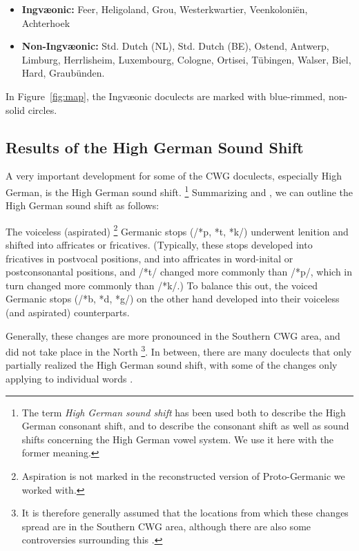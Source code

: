 \documentclass[a4paper]{article}
\begin{document}
\begin{itemize}
\item 
\textbf{Ingv\ae{}onic:}
Feer, Heligoland, Grou,
Westerkwartier, Veenkoloni\"{e}n, Achterhoek

\item
\textbf{Non-Ingv\ae{}onic:}
Std. Dutch (NL), Std. Dutch (BE), Ostend, Antwerp, Limburg,
Herrlisheim, Luxembourg, Cologne,
Ortisei, T\"{u}bingen, Walser, Biel, Hard, Graub\"{u}nden.
\end{itemize}

In Figure~\ref{fig:map}, the Ingv\ae{}onic doculects
are marked with blue-rimmed, non-solid circles.

\subsection{Results of the High German Sound Shift}

A very important development for some of the CWG doculects,
especially High German, is the High German sound shift.
\footnote{
The term \textit{High German sound shift} has been used both
to describe the High German consonant shift,
and to describe the consonant shift as well as
sound shifts concerning the High German vowel system.
We use it here with the former meaning.
}
Summarizing \citet[pp. 47--48]{harbert2007germanic}
and \citet[pp. 62--64]{koenig2015dtv},
we can outline the High German sound shift as follows:

The voiceless (aspirated)
\footnote{
Aspiration is not marked in the reconstructed version of Proto-Germanic
we worked with.
}
Germanic stops (/*p, *t, *k/)
underwent lenition and shifted into affricates or fricatives.
(Typically, these stops developed into fricatives in postvocal positions,
and into affricates in word-inital or postconsonantal positions,
and /*t/ changed more commonly than /*p/,
which in turn changed more commonly than /*k/.)
To balance this out,
the voiced Germanic stops (/*b, *d, *g/) on the other hand
developed into their voiceless (and aspirated) counterparts.

Generally, these changes are more pronounced
in the Southern CWG area, and did not take place in the North
\cite[p. 33]{noble1983modern}
\footnote{
It is therefore generally assumed that the locations
from which these changes spread are in the Southern CWG area,
although there are also some controversies surrounding this
\citep[pp. 155--181]{goblirsch2005lautverschiebungen}.
}.
In between, there are many doculects
that only partially realized the High German sound shift,
with some of the changes only applying to individual words
\citep[p. 63]{koenig2015dtv}.
\end{document}

